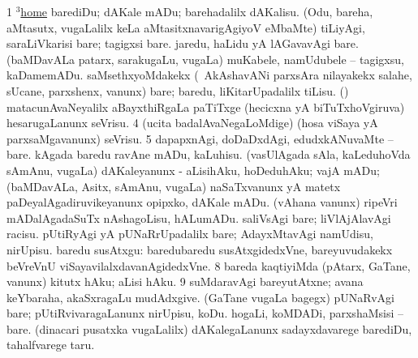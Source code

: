 \noindent
\gl{\pagu}
\expl{}
\bmng
\bnum
\num{1}  \hyperref{kandict_h.pdf}{H}{home(3) nuga(5)}{$^3$home}  
  
\banum
{} barediDu; dAKale mADu; barehadalilx dAKalisu. 
 (Odu, bareha, aMtasutx, \mo vugaLalilx keLa aMtasitxnavarigAgiyoV eMbaMte) tiLiyAgi, saraLiVkarisi bare; tagigxsi bare. 
 jaredu, haLidu yA lAGavavAgi bare. 
 (baMDavALa patarx, sarakugaLu, \mo vugaLa) muKabele, namUdubele -- tagigxsu, kaDamemADu. 
\eanum
\numie
{}  
\banum
{} saMsethxyoMdakekx (\kanmu\ AkAshavANi parxsAra nilayakekx salahe, sUcane, parxshenx, \mo vanunx) bare; baredu, liKitarUpadalilx tiLisu. 
 (\ame) matacunAvaNeyalilx aBayxthiRgaLa paTiTxge (hecicxna yA biTuTxhoVgiruva) hesarugaLanunx seVrisu. 
\eanum
\numie
\num{4}  (ucita badalAvaNegaLoMdige) (hosa viSaya yA parxsaMgavanunx) seVrisu. 
\num{5}  dapapxnAgi, doDaDxdAgi, edudxkANuvaMte -- bare. 
  
\banum
{} kAgada baredu ravAne mADu, kaLuhisu. 
 (vasUlAgada sAla, kaLeduhoVda sAmAnu, \mo vugaLa) dAKaleyanunx - aLisihAku, hoDeduhAku; vajA mADu; (baMDavALa, Asitx, sAmAnu, \mo vugaLa) naSaTxvanunx yA matetx paDeyalAgadiruvikeyanunx opipxko, dAKale mADu. 
 (vAhana \mo vanunx) ripeVri mADalAgadaSuTx nAshagoLisu, hALumADu. 
 saliVsAgi bare; liVlAjAlavAgi racisu. 
\eanum
\numie
{}  
\banum
{} pUtiRyAgi yA pUNaRrUpadalilx bare; AdayxMtavAgi namUdisu, nirUpisu. 
 baredu susAtxgu:  baredubaredu susAtxgidedxVne, bareyuvudakekx beVreVnU viSayavilalxdavanAgidedxVne. 
\eanum
\numie
\num{8}  bareda kaqtiyiMda (pAtarx, GaTane, \mo vanunx) kitutx hAku; aLisi hAku. 
\num{9}  suMdaravAgi bareyutAtxne; avana keYbaraha, akaSxragaLu mudAdxgive. 
  
\banum
{} (GaTane \mo vugaLa bagegx) pUNaRvAgi bare; pUtiRvivaragaLanunx nirUpisu, koDu. 
 hogaLi, koMDADi, parxshaMsisi -- bare. 
 (dinacari pusatxka \mo vugaLalilx) dAKalegaLanunx sadayxdavarege barediDu, tahalfvarege taru. 
\eanum
\numie
\enum
\emng
\eentry

\bentry
{} 
\gl{\nA}
\enum
\emng

